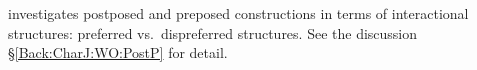  investigates postposed and preposed constructions
in terms of interactional structures:
preferred vs.~dispreferred structures.
See the discussion \S \ref{Back:CharJ:WO:PostP} for detail.
%
%

